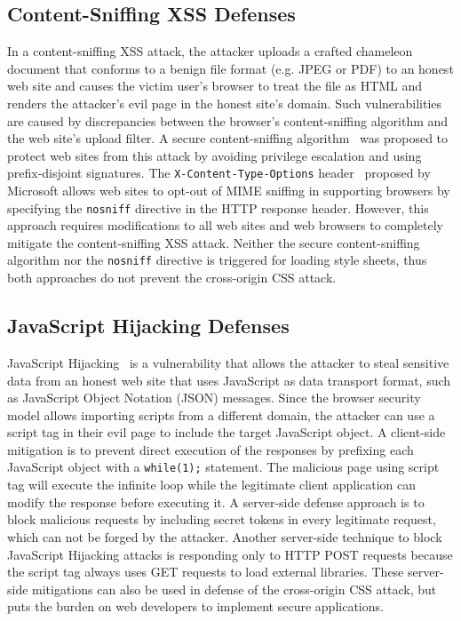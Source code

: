 \documentclass{acm_proc_article-sp}
\begin{document}
\subsection{Content-Sniffing XSS Defenses}
In a content-sniffing XSS attack, the attacker uploads a crafted chameleon document that conforms to a benign file format (e.g. JPEG or PDF) to an honest web site and causes the victim user's browser to treat the file as HTML and renders the attacker's evil page in the honest site's domain. Such vulnerabilities are caused by discrepancies between the browser's content-sniffing algorithm and the web site's upload filter. A secure content-sniffing algorithm~\cite{securecontentsniffing} was proposed to protect web sites from this attack by avoiding privilege escalation and using prefix-disjoint signatures. The \texttt{X-Content-Type-Options} header~\cite{nosniff} proposed by Microsoft allows web sites to opt-out of MIME sniffing in supporting browsers by specifying the \texttt{nosniff} directive in the HTTP response header. However, this approach requires modifications to all web sites and web browsers to completely mitigate the content-sniffing XSS attack. Neither the secure content-sniffing algorithm nor the \texttt{nosniff} directive is triggered for loading style sheets, thus both approaches do not prevent the cross-origin CSS attack.

\subsection{JavaScript Hijacking Defenses}
JavaScript Hijacking~\cite{jshijacking} is a vulnerability that allows the attacker to steal sensitive data from an honest web site that uses JavaScript as data transport format, such as JavaScript Object Notation (JSON) messages. Since the browser security model allows importing scripts from a different domain, the attacker can use a script tag in their evil page to include the target JavaScript object. A client-side mitigation is to prevent direct execution of the responses by prefixing each JavaScript object with a \texttt{while(1);} statement. The malicious page using script tag will execute the infinite loop while the legitimate client application can modify the response before executing it. A server-side defense approach is to block malicious requests by including secret tokens in every legitimate request, which can not be forged by the attacker. Another server-side technique to block JavaScript Hijacking attacks is responding only to HTTP POST requests because the script tag always uses GET requests to load external libraries. These server-side mitigations can also be used in defense of the cross-origin CSS attack, but puts the burden on web developers to implement secure applications.
\end{document}

